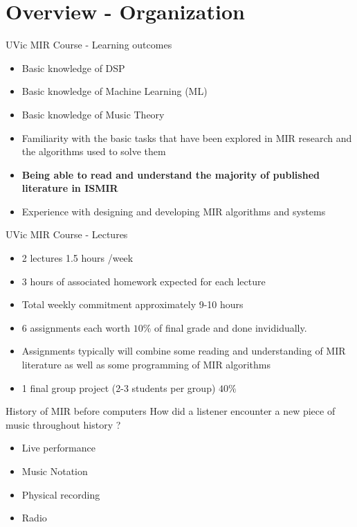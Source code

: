 \documentclass[12pt]{beamer}
\begin{document}
\section{Overview - Organization}


\begin{frame}{UVic MIR Course - Learning outcomes}
\begin{itemize} 
\item{Basic knowledge of DSP} 
\item{Basic knowledge of Machine Learning (ML)} 
\item{Basic knowledge of Music Theory} 
\item{Familiarity with the basic tasks that have been 
explored in MIR research and the algorithms used to solve them} 
\item{{\bf Being able to read and understand the majority 
of published literature in ISMIR}}
\item{Experience with designing and developing MIR algorithms and 
systems} 
\end{itemize} 
\end{frame}


\begin{frame}{UVic MIR Course - Lectures}
\begin{itemize} 
\item{2 lectures 1.5 hours /week}
\item{3 hours of associated homework expected for each lecture} 
\item{Total weekly commitment approximately 9-10 hours} 
\item{6 assignments each worth $10\%$ of final grade and done invididually.}
\item{Assignments typically will combine some reading and understanding of MIR literature as well as some programming of MIR algorithms} 
\item{1 final group project (2-3 students per group) $40\%$} 
\end{itemize} 
\end{frame}{}



\begin{frame}{History of MIR before computers} 
How did a listener encounter a new piece of music throughout history ? 
\begin{itemize} 
\item{Live performance} 
\item{Music Notation}
\item{Physical recording} 
\item{Radio} 
\end{itemize} 
\end{frame} 
\end{document}
